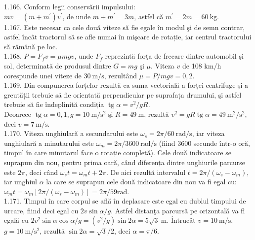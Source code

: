 1.166. Conform legii conservării impulsului:\\ $m v=\left(m+m^{\prime}\right) v^{\prime}$, de unde $m+m^{\prime}=3 m$, astfel că $m^{\prime}=2 m=60 \mathrm{~kg}$.\\

1.167. Este necesar ca cele două viteze să fie egale în modul şi de semn contrar, astfel încât tractorul să se afle numai în mişcare de rotație, iar centrul tractorului să rămână pe loc.\\

1.168. $P=F_{f} v=\mu m g v$, unde $F_{f}$ reprezintă forţa de frecare dintre automobil şi sol, determinată de produsul dintre $G=m g$ şi $\mu$. Viteza $v$ de 108 $\mathrm{km} / \mathrm{h}$ corespunde unei viteze de $30 \mathrm{~m} / \mathrm{s}$, rezultând $\mu=P / m g v=0,2$.\\

1.169. Din compunerea forțelor rezultă ca suma vectorială a forței centrifuge și a greutății trebuie să fie orientată perpendicular pe suprafața drumului, şi astfel trebuie să fie îndeplinită condiția $\operatorname{tg} \alpha=v^{2} / g R$.\\ Deoarece $\operatorname{tg} \alpha=0,1, g=10 \mathrm{~m} / \mathrm{s}^{2}$ şi $R=49 \mathrm{~m}$, rezultă $v^{2}=g R \operatorname{tg} \alpha=49 \mathrm{~m}^{2} / \mathrm{s}^{2}$, deci $v=7 \mathrm{~m} / \mathrm{s}$.\\

1.170. Viteza unghiulară a secundarului este $\omega_{s}=2 \pi / 60 \mathrm{~rad} / \mathrm{s}$, iar viteza unghiulară a minutarului este $\omega_{m}=2 \pi / 3600 \mathrm{~rad} / \mathrm{s}$ (fiind 3600 secunde într-o oră, timpul în care minutarul face o rotație completă). Cele două indicatoare se suprapun din nou, pentru prima oară, când diferența dintre unghiurile parcurse este $2 \pi$, deci când $\omega_{s} t=\omega_{m} t+2 \pi$. De aici rezultă intervalul $t=2 \pi /\left(\omega_{s}-\omega_{m}\right)$, iar unghiul $\alpha$ la care se suprapun cele două indicatoare din nou va fi egal cu: $\omega_{m} t=\omega_{m}\left[2 \pi /\left(\omega_{s}-\omega_{m}\right)\right]=2 \pi / 59 \mathrm{rad}$.\\

1.171. Timpul în care corpul se află în deplasare este egal cu dublul timpului de urcare, fiind deci egal cu $2 v \sin \alpha / g$. Astfel distanţa parcursă pe orizontală va fì egală cu $2 v^{2} \sin \alpha \cos \alpha / g=\left(v^{2} / g\right) \sin 2 \alpha=5 \sqrt{3} \mathrm{~m}$. Întrucât $v=10 \mathrm{~m} / \mathrm{s}$, $g=10 \mathrm{~m} / \mathrm{s}^{2}$, rezultă $\sin 2 \alpha=\sqrt{3} / 2$, deci $\alpha=\pi / 6$.\\

